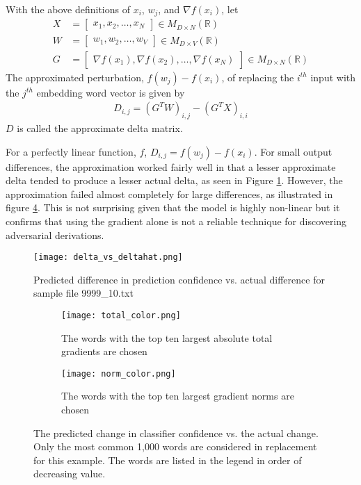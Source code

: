 \begin{definition}

With the above definitions of $x_i$, $w_j$, and $\nabla f(x_i)$, let
\begin{align}
X &= 
\begin{bmatrix}
x_1, x_2, \dots, x_N
\end{bmatrix} \in M_{D\times N}(\mathbb{R})\\
W &= 
\begin{bmatrix}
w_1, w_2, \dots, w_V
\end{bmatrix} \in M_{D\times V}(\mathbb{R})\\
G &= 
\begin{bmatrix}
\nabla f(x_1), \nabla f(x_2), \dots, \nabla f(x_N)
\end{bmatrix} \in M_{D\times N}(\mathbb{R})
\end{align}
\noindent
The approximated perturbation, $f(w_j)-f(x_i)$, of replacing the $i^{th}$ input with the $j^{th}$ embedding word vector is given by 
\begin{align}
    D_{i,j} = (G^TW)_{i,j} - (G^TX)_{i,i}
\end{align}
\noindent
$D$ is called the approximate delta matrix.
\end{definition}
\noindent
For a perfectly linear function, $f$, $D_{i,j} = f(w_j) - f(x_i)$.  For small output differences, the approximation worked fairly well in that a lesser approximate delta tended to produce a lesser actual delta, as seen in Figure \ref{fig:dvhat}.  However, the approximation failed almost completely for large differences, as illustrated in figure \ref{fig:outliers}.  This is not surprising given that the model is highly non-linear but it confirms that using the gradient alone is not a reliable technique for discovering adversarial derivations.

\begin{figure}
    \centering
    \texttt{[image: delta\_vs\_deltahat.png]}
    \caption{Predicted difference in prediction confidence vs. actual difference for sample file 9999\_10.txt}
    \label{fig:dvhat}
\end{figure}

\begin{figure}
\centering
\begin{subfigure}[t]{0.45\textwidth}
  \centering
  \texttt{[image: total\_color.png]}
  \caption{The words with the top ten largest absolute total gradients are chosen}
  \label{fig:total_color}
\end{subfigure}\hfill
\begin{subfigure}[t]{0.45\textwidth}
  \centering
  \texttt{[image: norm\_color.png]}
  \caption{The words with the top ten largest gradient norms are chosen}
  \label{fig:norm_color}
\end{subfigure}
\caption{The predicted change in classifier confidence vs. the actual change.  Only the most common 1,000 words are considered in replacement for this example.  The words are listed in the legend in order of decreasing value.}
\label{fig:outliers}
\end{figure}

